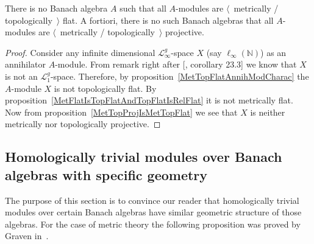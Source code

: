 \begin{proposition} There is no Banach algebra $A$ such that all $A$-modules are
$\langle$~metrically / topologically~$\rangle$ flat. A fortiori, there is no
such Banach algebras that all $A$-modules are $\langle$~metrically /
topologically~$\rangle$ projective.
\end{proposition}
\begin{proof} Consider any infinite dimensional $\mathscr{L}_\infty^g$-space $X$
(say $\ell_\infty(\mathbb{N})$) as an annihilator $A$-module. From remark right
after [\cite{DefFloTensNorOpId}, corollary 23.3] we know that $X$ is not an
$\mathscr{L}_1^g$-space. Therefore, by proposition~\ref{MetTopFlatAnnihModCharac}
the $A$-module $X$ is not topologically flat. By
proposition~\ref{MetFlatIsTopFlatAndTopFlatIsRelFlat} it is not metrically flat.
Now from proposition~\ref{MetTopProjIsMetTopFlat} we see that $X$ is neither
metrically nor topologically projective.
\end{proof}


\subsection{
    Homologically trivial modules over Banach algebras with specific geometry}\label{
    SubSectionHomologicallyTrivialModulesOverBanachAlgebrasWithSpecificGeometry
}

The purpose of this section is to convince our reader that homologically trivial
modules over certain Banach algebras have similar geometric structure of those
algebras. For the case of metric theory the following proposition was proved by
Graven in~\cite{GravInjProjBanMod}.

